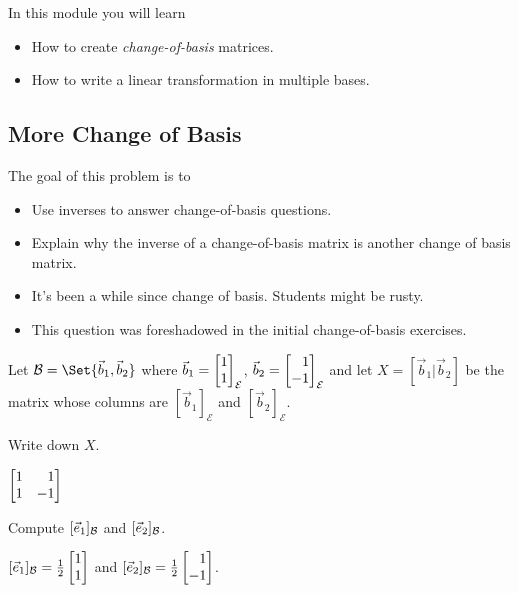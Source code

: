 \documentclass{workbook}
\newcommand{\displayonlynewpage}{\begin{displayonly}\newpage\end{displayonly}}
\newcommand{\bookonlynewpage}{\begin{bookonly}\newpage\end{bookonly}}
\begin{document}
\begin{module}

	In this module you will learn
	\begin{itemize}
		\item How to create \emph{change-of-basis} matrices.
		\item How to write a linear transformation in multiple bases.
	\end{itemize}

	
	
\end{module}
\begin{slide}
	\bookonlynewpage
	\displayonlynewpage
\subsection*{More Change of Basis}
	\question
	\begin{annotation}
		\begin{goals}

			The goal of this problem is to
			\begin{itemize}
				\item Use inverses to answer change-of-basis questions.
				\item Explain why the inverse of a change-of-basis matrix is another
					change of basis matrix.
			\end{itemize}
		\end{goals}

		\begin{notes}
			\begin{itemize}
				\item It's been a while since change of basis. Students might be rusty.
				\item This question was foreshadowed in the initial change-of-basis exercises.
			\end{itemize}
		\end{notes}
	\end{annotation}
	Let $\mathcal B=\Set{\vec b_1,\vec b_2}$ where $\vec b_1=\mat{1\\1}_{\mathcal E}$, $\vec b_2=\mat{1\\-1}_{\mathcal E}$
	and let $X=[\vec b_1|\vec b_2]$ be the matrix whose columns are $[\vec b_1]_{\mathcal E}$ and $[\vec b_2]_{\mathcal E}$.
	\begin{parts}
		\item Write down $X$.
			\begin{solution}[inline]
				$\mat{1&1\\1&-1}$
			\end{solution}
		\item Compute $[{\vec e_1}]_{\mathcal B}$ and $[{\vec e_2}]_{\mathcal B}$.
			\begin{solution}
				$[\xhat]_{\mathcal B}=\frac{1}{2}\mat{1\\1}$ and
				$[\yhat]_{\mathcal B}=\frac{1}{2}\mat{1\\-1}$.


\end{solution}
\end{parts}
\end{slide}
\end{document}
